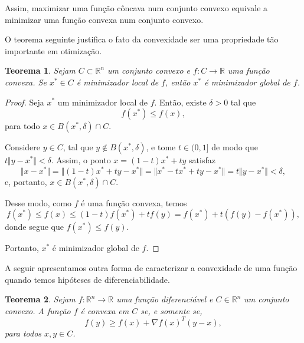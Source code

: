 \documentclass[12pt,a4paper]{scrartcl}
\def\RR{\mathds{R}}
\newtheorem{teo}{Teorema}
\theoremstyle{definition}%
\begin{document}
Assim, maximizar uma função côncava num conjunto convexo equivale a minimizar uma função convexa num conjunto convexo.


O teorema seguinte justifica o fato da convexidade ser uma propriedade tão importante em otimização.


\begin{teo} 
Sejam $C \subset \RR^{n}$ um conjunto convexo e $f:C \rightarrow \RR$ uma função convexa. Se $x^{*} \in C$ é minimizador local de $f$, então $x^{*}$ é minimizador global de $f$.
\end{teo}
\begin{proof}
Seja $x^{*}$ um minimizador local de $f$. Então, existe $\delta > 0$ tal que 
\[
f(x^{*}) \leq f(x), 
\]
para todo $x \in B(x^{*}, \delta) \cap C$. 

Considere $y \in C$, tal que $y \notin B(x^{*}, \delta)$, e tome $t \in (0,1]$ de modo que $t \Vert y-x^{*} \Vert < \delta$. Assim, o ponto $x = (1-t)x^{*} + ty$ satisfaz
\[
\Vert x - x^{*} \Vert = \Vert (1-t)x^{*} + ty - x^{*} \Vert = \Vert x^{*} - tx^{*} + ty - x^{*} \Vert = t \Vert y - x^{*} \Vert < \delta ,
\]
e, portanto, $x \in B(x^{*}, \delta) \cap C$.

Desse modo, como $f$ é uma função convexa, temos
\[
f(x^{*}) \leq f(x) \leq (1-t)f(x^{*}) + tf(y) = f(x^{*}) + t(f(y)-f(x^{*})),
\]
donde segue que $f(x^{*}) \leq f(y)$.

Portanto, $x^{*}$ é minimizador global de $f$.
\end{proof}


A seguir apresentamos outra forma de caracterizar a convexidade de uma função quando temos hipóteses de diferenciabilidade.


\begin{teo}  \label{teo:diferenciabilidade_e_convexidade}
Sejam $f: \RR^{n} \rightarrow \RR $ uma função diferenciável e $C \in \RR^{n}$ um conjunto convexo. A função $f$ é convexa em $C$ se, e somente se, 
\[
f(y) \geq f(x) + \nabla f(x)^{T}(y-x),
\]
para todos $x, y \in C$.
\end{teo}
\end{document}
